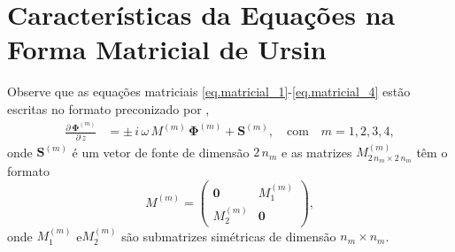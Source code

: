 \section{Caracter\'isticas da Equa\c{c}\~oes na Forma Matricial de Ursin}

%
Observe que as equa\c{c}\~oes matriciais \ref{eq.matricial_1}-\ref{eq.matricial_4} est\~ao escritas no formato preconizado por \cite{Ursin-1983}, 
\begin{align}\label{eq.matricial}
\frac{\partial\,\mathbf{\Phi}^{(m)}}{\partial\,z} &= \pm\,i\,\omega\,M^{(m)}\,\mathbf{\Phi}^{(m)}+\mathbf{S}^{(m)},\quad\text{com}\quad m=1,2,3,4,
\end{align}
onde $\mathbf{S}^{(m)}$ \'e um vetor de fonte de dimens\~ao $2\,n_m$ e as matrizes $M^{(m)}_{2\,n_m\times2\,n_m}$ t\^em o formato
\begin{equation}
M^{(m)}
=
\begin{pmatrix}
\mathbf{0}&M_1^{(m)}\\
M_2^{(m)}&\mathbf{0}
\end{pmatrix},
\end{equation}
onde $M_1^{(m)}$ e$M_2^{(m)}$ s\~ao submatrizes sim\'etricas de dimens\~ao $n_m\times n_m$.

